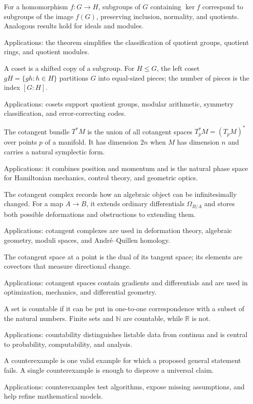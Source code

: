 For a homomorphism $f:G\to H$, subgroups of $G$ containing $\ker f$ correspond to subgroups of the image $f(G)$, preserving inclusion, normality, and quotients. Analogous results hold for ideals and modules. \par\noindent Applications: the theorem simplifies the classification of quotient groups, quotient rings, and quotient modules.

 A coset is a shifted copy of a subgroup. For $H\le G$, the left coset $gH=\{gh:h\in H\}$ partitions $G$ into equal-sized pieces; the number of pieces is the index $[G:H]$. \par\noindent Applications: cosets support quotient groups, modular arithmetic, symmetry classification, and error-correcting codes.

The cotangent bundle $T^*M$ is the union of all cotangent spaces $T_p^*M=(T_pM)^*$ over points $p$ of a manifold. It has dimension $2n$ when $M$ has dimension $n$ and carries a natural symplectic form. \par\noindent Applications: it combines position and momentum and is the natural phase space for Hamiltonian mechanics, control theory, and geometric optics.

The cotangent complex records how an algebraic object can be infinitesimally changed. For a map $A\to B$, it extends ordinary differentials $\Omega_{B/A}$ and stores both possible deformations and obstructions to extending them. \par\noindent Applications: cotangent complexes are used in deformation theory, algebraic geometry, moduli spaces, and André--Quillen homology.

The cotangent space at a point is the dual of its tangent space; its elements are covectors that measure directional change. \par\noindent Applications: cotangent spaces contain gradients and differentials and are used in optimization, mechanics, and differential geometry.

A set is countable if it can be put in one-to-one correspondence with a subset of the natural numbers. Finite sets and $\mathbb N$ are countable, while $\mathbb R$ is not. \par\noindent Applications: countability distinguishes listable data from continua and is central to probability, computability, and analysis.

A counterexample is one valid example for which a proposed general statement fails. A single counterexample is enough to disprove a universal claim. \par\noindent Applications: counterexamples test algorithms, expose missing assumptions, and help refine mathematical models.

